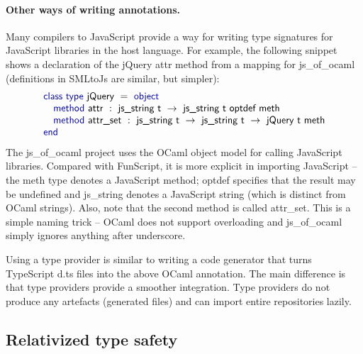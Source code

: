 \documentclass[submission,copyright,creativecommons]{eptcs}
\newcommand{\kvd}[1]{\textnormal{\textcolor{kvdclr}{\sffamily #1}}}
\newcommand{\ident}[1]{\textnormal{\sffamily #1}}
\begin{document}
\vspace{-1em}
\paragraph{Other ways of writing annotations.}
Many compilers to JavaScript provide a way for writing type signatures for JavaScript
libraries in the host language. For example, the following snippet shows a declaration of the
jQuery \ident{attr} method from a mapping for js\_of\_ocaml \cite{js_ocmal} (definitions in
SMLtoJs \cite{js_sml} are similar, but simpler):
%
\begin{equation*}
\begin{array}{l}
 \kvd{class type}~\ident{jQuery}~=~\kvd{object} \\
 \quad \kvd{method}~\ident{attr}~:~\ident{js\_string t} ~\rightarrow~ \ident{js\_string t optdef meth} \\
 \quad \kvd{method}~\ident{attr\_set}~:~\ident{js\_string t} ~\rightarrow~ \ident{js\_string t} ~\rightarrow~ \ident{jQuery t meth} \\
 \kvd{end}
\end{array}
\end{equation*}
%
The js\_of\_ocaml project uses the OCaml object model for calling JavaScript libraries.
Compared with FunScript, it is more explicit in importing JavaScript -- the \ident{meth}
type denotes a JavaScript method; \ident{optdef} specifies that the result may be
undefined and \ident{js\_string} denotes a JavaScript string (which is distinct from OCaml
strings). Also, note that the second method is called \ident{attr\_set}. This is a simple
naming trick -- OCaml does not support overloading and js\_of\_ocaml simply ignores anything
after underscore.

Using a type provider is similar to writing a code generator that turns TypeScript
\textcolor{strclr}{\ttfamily d.ts} files into the above OCaml annotation. The main difference
is that type providers provide a smoother integration. Type providers do not produce any artefacts
(generated files) and can import entire repositories lazily.


\subsection{Relativized type safety}
\label{sec:tp-relative}
\end{document}
